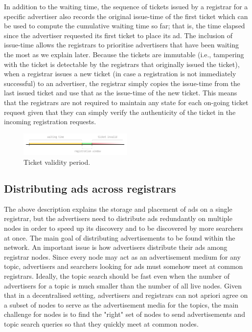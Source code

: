In addition to the waiting time,  the sequence of tickets issued by a registrar for a specific advertiser also records the original issue-time of the first ticket which can be used to compute the cumulative waiting time so far; that is, the time elapsed since the advertiser requested its first ticket to place its ad. The inclusion of issue-time allows the registrars to prioritise advertisers that have been waiting the most as we explain later. Because the tickets are immutable (i.e., tampering with the ticket is detectable by the registrars that originally issued the ticket), when a registrar issues a new ticket (in case a registration is not immediately successful) to an advertiser, the registrar simply copies the issue-time from the last issued ticket and use that as the issue-time of the new ticket. This means that the registrars are not required to maintain any state for each on-going ticket request given that they can simply verify the authenticity of the ticket in the incoming registration requests. 

    
\begin{figure}
    \includegraphics[width=0.5\textwidth]{img/ticket-validity}
    \caption{Ticket validity period.}
    \label{fig:ticket_validity}
\end{figure}

\subsection{Distributing ads across registrars}\label{sec:registration_multi}

The above description explains the storage and placement of ads on a single registrar, but the advertisers need to distribute ads redundantly on multiple nodes in order to speed up its discovery and to be discovered by more searchers at once. 
The main goal of distributing advertisements to be found within the network. An important issue is how advertisers distribute their ads among registrar nodes. 
Since every node may act as an advertisement medium for any topic,  advertisers and searchers looking for ads must somehow meet at common registrars. 
Ideally, the topic search should be fast even when the number of advertisers for a topic is much smaller than the number of all live nodes. Given that in a decentralised setting, advertisers and registrars can not apriori agree on a subset of nodes to serve as the advertisement media for the topics, the main challenge for nodes is to find the "right" set of nodes to send advertisements and topic search queries so that they quickly meet at common nodes.

